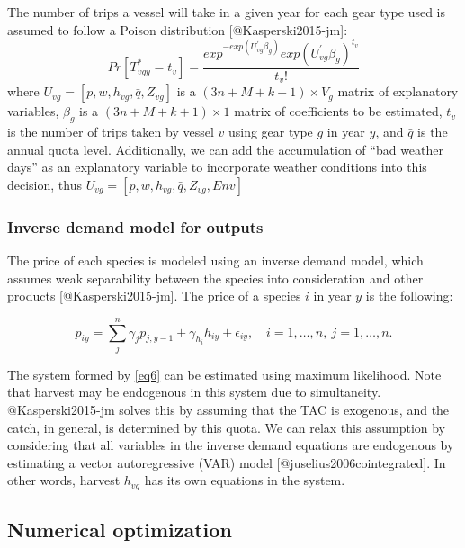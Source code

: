 The number of trips a vessel will take in a given year for each gear
type used is assumed to follow a Poison distribution
{[}@Kasperski2015-jm{]}: \begin{equation}
Pr\left[T^{*}_{vgy} = t_v\right] = \frac{exp^{-exp(U^{'}_{vg}\beta_g)}exp(U^{'}_{vg}\beta_g)^{t_v}}{t_v !}
\label{eq5}
\end{equation} where \(U_{vg}=[p,w,h_{vg},\bar{q},Z_{vg}]\) is a
\((3n+M+k+1)×V_g\) matrix of explanatory variables, \(\beta_g\) is a
\((3n+M+k+1)\times1\) matrix of coefficients to be estimated, \(t_v\) is
the number of trips taken by vessel \(v\) using gear type \(g\) in year
\(y\), and \(\bar{q}\) is the annual quota level. Additionally, we can
add the accumulation of ``bad weather days'' as an explanatory variable
to incorporate weather conditions into this decision, thus
\(U_{vg}=[p,w,h_{vg},\bar{q},Z_{vg}, Env]\)

\hypertarget{inverse-demand-model-for-outputs}{%
\subsubsection{Inverse demand model for
outputs}\label{inverse-demand-model-for-outputs}}

The price of each species is modeled using an inverse demand model,
which assumes weak separability between the species into consideration
and other products {[}@Kasperski2015-jm{]}. The price of a species \(i\)
in year \(y\) is the following:

\begin{equation}
p_{iy} = \sum_j^n \gamma_j p_{j,y-1} + \gamma_{h_i} h_{iy} + \epsilon_{iy}, \quad i = 1,\ldots,n, \ j = 1,\ldots,n.
\label{eq6}
\end{equation}

The system formed by \eqref{eq6} can be estimated using maximum
likelihood. Note that harvest may be endogenous in this system due to
simultaneity. @Kasperski2015-jm solves this by assuming that the TAC is
exogenous, and the catch, in general, is determined by this quota. We
can relax this assumption by considering that all variables in the
inverse demand equations are endogenous by estimating a vector
autoregressive (VAR) model {[}@juselius2006cointegrated{]}. In other
words, harvest \(h_{vg}\) has its own equations in the system.

\hypertarget{numerical-optimization}{%
\subsection{Numerical optimization}\label{numerical-optimization}}

